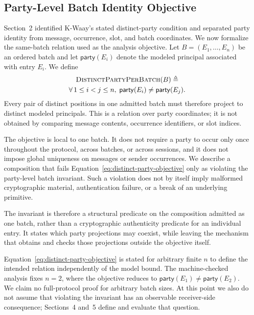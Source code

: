 
\subsection{Party-Level Batch Identity Objective}

Section~2 identified K-Waay's stated distinct-party condition and separated
party identity from message, occurrence, slot, and batch coordinates. We now
formalize the same-batch relation used as the analysis objective. Let
\(B=(E_1,\ldots,E_n)\) be an ordered batch and let
\(\mathsf{party}(E_i)\) denote the modeled principal associated with entry
\(E_i\). We define
\begin{equation}
  \begin{gathered}
  \textsc{DistinctPartyPerBatch}(B)
  \mathrel{\triangleq}
  \\ \forall\,1 \leq i < j \leq n,\;
  \mathsf{party}(E_i)\neq\mathsf{party}(E_j).
  \end{gathered}
  \label{eq:distinct-party-objective}
\end{equation}
Every pair of distinct positions in one admitted batch must therefore project
to distinct modeled principals. This is a relation over party coordinates; it
is not obtained by comparing message contents, occurrence identifiers, or slot
indices.

The objective is local to one batch. It does not require a party to occur only
once throughout the protocol, across batches, or across sessions, and it does
not impose global uniqueness on messages or sender occurrences. We describe a
composition that fails Equation~\eqref{eq:distinct-party-objective} only as
violating the party-level batch invariant. Such a violation does not by itself
imply malformed cryptographic material, authentication failure, or a break of
an underlying primitive.

The invariant is therefore a structural predicate on the composition admitted
as one batch, rather than a cryptographic authenticity predicate for an
individual entry. It states which party projections may coexist, while leaving
the mechanism that obtains and checks those projections outside the objective
itself.

Equation~\eqref{eq:distinct-party-objective} is stated for arbitrary finite
\(n\) to define the intended relation independently of the model bound. The
machine-checked analysis fixes \(n=2\), where the objective reduces to
\(\mathsf{party}(E_1)\neq\mathsf{party}(E_2)\). We claim no full-protocol proof
for arbitrary batch sizes. At this point we also do not assume that violating
the invariant has an observable receiver-side consequence; Sections~4 and~5
define and evaluate that question.

